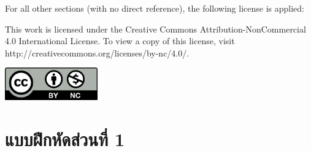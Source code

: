 \documentclass[12pt]{octavo}
\begin{document}
For all other sections (with no direct reference), the following license is applied:

This work is licensed under the Creative Commons Attribution-NonCommercial 4.0 International License. To view a copy of this license, visit
http://creativecommons.org/licenses/by-nc/4.0/.

\begin{center}
\includegraphics[width=4cm]{by-nc}
\end{center}

\newpage

{
\sffamily
\tableofcontents
}

\part{\sffamily แบบฝึกหัดส่วนที่ 1}
\pagestyle{plain}
\fancyhead[R]{\sffamily {\leftmark}}













\nocite{*}

\clearpage



\end{document}
